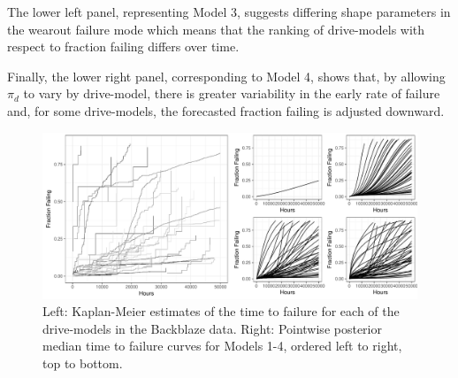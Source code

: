 \documentclass[12pt]{article}
\begin{document}
The lower left panel, representing Model 3, suggests differing shape parameters in the wearout failure mode which means that the ranking of drive-models with respect to fraction failing differs over time.

Finally, the lower right panel, corresponding to Model 4, shows that, by allowing $\pi_d$ to vary by drive-model, there is greater variability in the early rate of failure and, for some drive-models, the forecasted fraction failing is adjusted downward. 

\begin{figure}[H]
\includegraphics[width=\textwidth]{heterogeneity-compare-preliminary}
\caption{Left: Kaplan-Meier estimates of the time to failure for each of the drive-models in the Backblaze data. Right: Pointwise posterior median time to failure curves for Models 1-4, ordered left to right, top to bottom.}
\label{fig:fig2}
\end{figure}
\end{document}
